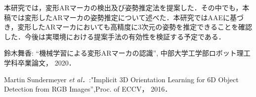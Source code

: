 \documentclass{jsarticle}
\begin{document}





本研究では，変形ARマーカの検出及び姿勢推定法を提案した．その中でも，本稿では変形したARマーカの姿勢推定について述べた．本研究ではAAEに基づき，変形したARマーカにおいても高精度に3次元の姿勢を推定できることを確認した．今後は実環境における提案手法の有効性を検証する予定である．

%
%
%

\begin{thebibliography}{1}

{\scriptsize
{}
鈴木舞香: ``機械学習による変形ARマーカの認識'', 中部大学工学部ロボット理工学科卒業論文， 2020． }

{\scriptsize 
{}
Martin Sundermeyer {\em et al．}:"Implicit 3D Orientation Learning for 6D Object Detection from RGB Images'',Proc. of ECCV， 2016．}

\end{thebibliography}
\end{document}
